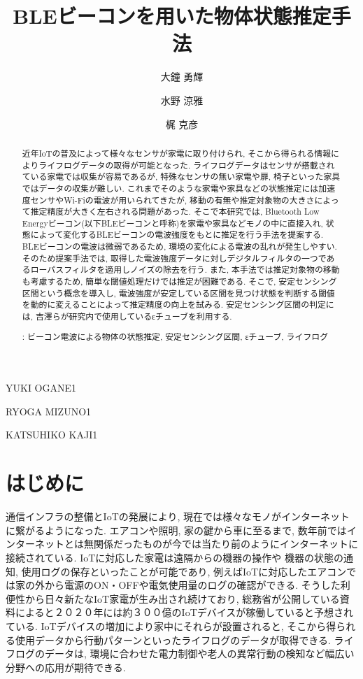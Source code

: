 \documentclass[Japanese]{dicomopapers}
\begin{document}
\title{BLEビーコンを用いた物体状態推定手法}


\author{大鐘 勇輝}{YUKI OGANE}{1}
\author{水野 涼雅}{RYOGA MIZUNO}{1}
\author{梶 克彦}{KATSUHIKO KAJI}{1}




\begin{abstract}
近年IoTの普及によって様々なセンサが家電に取り付けられ, そこから得られる情報によりライフログデータの取得が可能となった.
ライフログデータはセンサが搭載されている家電では収集が容易であるが, 特殊なセンサの無い家電や扉, 椅子といった家具ではデータの収集が難しい.
これまでそのような家電や家具などの状態推定には加速度センサやWi-Fiの電波が用いられてきたが, 移動の有無や推定対象物の大きさによって推定精度が大きく左右される問題があった.
そこで本研究では, Bluetooth Low Energyビーコン(以下BLEビーコンと呼称)を家電や家具などモノの中に直接入れ, 状態によって変化するBLEビーコンの電波強度をもとに推定を行う手法を提案する.
BLEビーコンの電波は微弱であるため, 環境の変化による電波の乱れが発生しやすい. そのため提案手法では, 取得した電波強度データに対しデジタルフィルタの一つであるローパスフィルタを適用しノイズの除去を行う.
また, 本手法では推定対象物の移動も考慮するため, 簡単な閾値処理だけでは推定が困難である. そこで, 安定センシング区間という概念を導入し, 電波強度が安定している区間を見つけ状態を判断する閾値を動的に変えることによって推定精度の向上を試みる. 安定センシング区間の判定には, 吉澤ら\cite{ips-chube}が研究内で使用しているεチューブを利用する.

 : ビーコン電波による物体の状態推定, 安定センシング区間, εチューブ, ライフログ


\end{abstract}

\maketitle

\section{はじめに}
通信インフラの整備とIoTの発展により, 現在では様々なモノがインターネットに繋がるようになった.
エアコンや照明, 家の鍵から車に至るまで, 数年前ではインターネットとは無関係だったものが今では当たり前のようにインターネットに接続されている.
IoTに対応した家電は遠隔からの機器の操作や 機器の状態の通知, 使用ログの保存といったことが可能であり, 例えばIoTに対応したエアコンでは家の外から電源のON・OFFや電気使用量のログの確認ができる.
そうした利便性から日々新たなIoT家電が生み出され続けており, 総務省が公開している資料\cite{soumusyo}によると２０２０年には約３００億のIoTデバイスが稼働していると予想されている.
IoTデバイスの増加により家中にそれらが設置されると, そこから得られる使用データから行動パターンといったライフログのデータが取得できる.
ライフログのデータは, 環境に合わせた電力制御や老人の異常行動の検知など幅広い分野への応用が期待できる.
\end{document}
